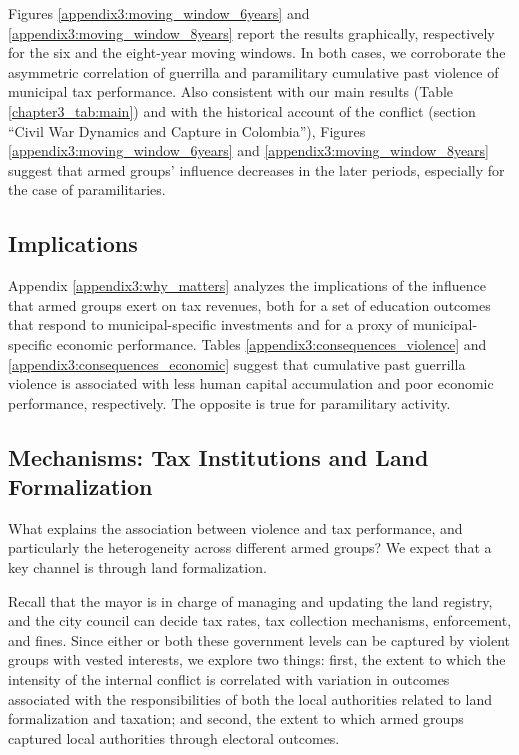 Figures \ref{appendix3:moving_window_6years} and \ref{appendix3:moving_window_8years} report the results graphically, respectively for the six and the eight-year moving windows. In both cases, we corroborate the asymmetric correlation of guerrilla and paramilitary cumulative past violence of municipal tax performance. Also consistent with our main results (Table \ref{chapter3_tab:main}) and with the historical account of the conflict (section ``Civil War Dynamics and Capture in Colombia''), Figures \ref{appendix3:moving_window_6years} and \ref{appendix3:moving_window_8years} suggest that armed groups' influence decreases in the later periods, especially for the case of paramilitaries.

\subsection{Implications}
Appendix \ref{appendix3:why_matters} analyzes the implications of the influence that armed groups exert on tax revenues, both for a set of education outcomes that respond to municipal-specific investments and for a proxy of municipal-specific economic performance. Tables \ref{appendix3:consequences_violence} and \ref{appendix3:consequences_economic} suggest that cumulative past guerrilla violence is associated with less human capital accumulation and poor economic performance, respectively. The opposite is true for paramilitary activity.

\subsection{Mechanisms: Tax Institutions and Land Formalization}

What explains the association between violence and tax performance, and particularly the heterogeneity across different armed groups? We expect that a key channel is through land formalization.
 
Recall that the mayor is in charge of managing and updating the land registry, and the city council can decide tax rates, tax collection mechanisms, enforcement, and fines. Since either or both these government levels can be captured by violent groups with vested interests, we explore two things: first, the extent to which the intensity of the internal conflict is correlated with variation in outcomes associated with the responsibilities of both the local authorities related to land formalization and taxation; and second, the extent to which armed groups captured local authorities through electoral outcomes.

